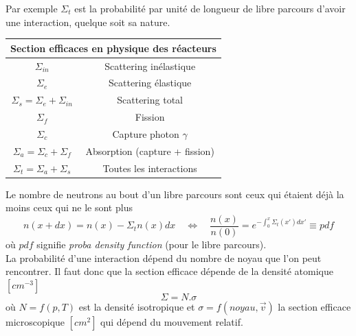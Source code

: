 Par exemple $\Sigma_t$ est la probabilité par unité de longueur de libre parcours 
d'avoir une interaction, quelque soit sa nature.
\begin{center}
\begin{tabular}{|c|c|}
\hline 
\multicolumn{2}{|c|}{Section efficaces en physique des réacteurs} \\ 
\hline 
\hline 
$\Sigma_{in}$ & Scattering inélastique \\ 
\hline 
$\Sigma_e$ & Scattering élastique \\ 
\hline 
$\Sigma_s = \Sigma_e+\Sigma_{in}$ & Scattering total \\ 
\hline 
$\Sigma_f$ & Fission \\ 
\hline 
$\Sigma_c$ & Capture photon $\gamma$ \\ 
\hline 
$\Sigma_a=\Sigma_c+\Sigma_f$ & Absorption (capture + fission) \\ 
\hline 
$\Sigma_t=\Sigma_a+\Sigma_s$ & Toutes les interactions \\ 
\hline 
\end{tabular} 
\end{center}


Le nombre de neutrons au bout d'un libre parcours sont ceux qui étaient déjà la moins ceux qui 
ne le sont plus
\begin{equation}
n(x+dx) = n(x)- \Sigma_t n(x) dx\quad \Leftrightarrow\quad \frac{n(x)}{n(0)} = e^{-\int_0^x \Sigma_t(x')dx'} \equiv pdf
\end{equation}
où $pdf$ signifie \textit{proba density function} (pour le libre parcours).\\

La probabilité d'une interaction dépend du nombre de noyau que l'on peut rencontrer. Il faut donc 
que la section efficace dépende de la densité atomique $[cm^{-3}]$
\begin{equation}
\Sigma = N.\sigma
\end{equation}
où $N=f(p,T)$ est la densité isotropique et $\sigma = f(noyau,\vec{v})$ la section efficace 
microscopique $[cm^2]$ qui dépend du mouvement relatif.\\


